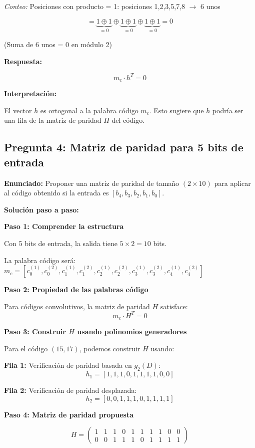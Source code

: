 \documentclass[11pt,a4paper]{article}
\begin{document}
\textit{Conteo:} Posiciones con producto = 1: posiciones 1,2,3,5,7,8 $\to$ 6 unos

\[
= \underbrace{1 \oplus 1}_{=0} \oplus \underbrace{1 \oplus 1}_{=0} \oplus \underbrace{1 \oplus 1}_{=0} = 0
\]

(Suma de 6 unos = $0$ en m\'odulo 2)

\textbf{Respuesta:}

\[
\boxed{m_c \cdot h^T = 0}
\]

\textbf{Interpretaci\'on:}

El vector $h$ es ortogonal a la palabra c\'odigo $m_c$. Esto sugiere que $h$ podr\'ia ser una fila de la matriz de paridad $H$ del c\'odigo.

\subsection*{Pregunta 4: Matriz de paridad para 5 bits de entrada}

\textbf{Enunciado:} Proponer una matriz de paridad de tama\~no $(2 \times 10)$ para aplicar al c\'odigo obtenido si la entrada es $[b_4, b_3, b_2, b_1, b_0]$.

\vspace{0.3cm}
\textbf{Soluci\'on paso a paso:}

\textbf{Paso 1: Comprender la estructura}

Con 5 bits de entrada, la salida tiene $5 \times 2 = 10$ bits.

La palabra c\'odigo ser\'a: $m_c = [c_0^{(1)}, c_0^{(2)}, c_1^{(1)}, c_1^{(2)}, c_2^{(1)}, c_2^{(2)}, c_3^{(1)}, c_3^{(2)}, c_4^{(1)}, c_4^{(2)}]$

\textbf{Paso 2: Propiedad de las palabras c\'odigo}

Para c\'odigos convolutivos, la matriz de paridad $H$ satisface:
\[
m_c \cdot H^T = 0
\]

\textbf{Paso 3: Construir $H$ usando polinomios generadores}

Para el c\'odigo $(15, 17)$, podemos construir $H$ usando:

\textbf{Fila 1:} Verificaci\'on de paridad basada en $g_2(D)$:
\[
h_1 = [1, 1, 1, 0, 1, 1, 1, 1, 0, 0]
\]

\textbf{Fila 2:} Verificaci\'on de paridad desplazada:
\[
h_2 = [0, 0, 1, 1, 1, 0, 1, 1, 1, 1]
\]

\textbf{Paso 4: Matriz de paridad propuesta}

\[
H = \begin{pmatrix}
1 & 1 & 1 & 0 & 1 & 1 & 1 & 1 & 0 & 0 \\
0 & 0 & 1 & 1 & 1 & 0 & 1 & 1 & 1 & 1
\end{pmatrix}
\]
\end{document}
